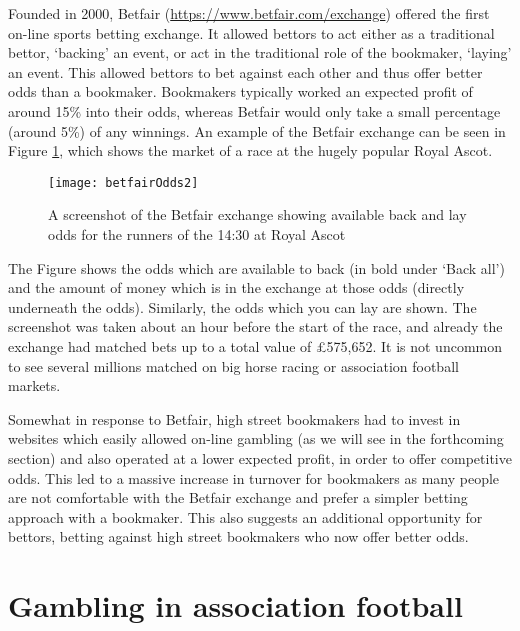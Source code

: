 Founded in 2000, Betfair (\url{https://www.betfair.com/exchange}) offered the first on-line sports betting exchange. It
allowed bettors to act either as a traditional bettor, `backing' an event, or act in the traditional role of the
bookmaker, `laying' an event. This allowed bettors to bet against each other and thus offer better odds than a
bookmaker. Bookmakers typically worked an expected profit of around 15\% into their odds, whereas Betfair would only
take a small percentage (around 5\%) of any winnings. An example of the Betfair exchange can be seen in Figure
\ref{fig:betfairOdds}, which shows the market of a race at the hugely popular Royal Ascot.
\begin{figure}[htp]
\begin{center}
  \texttt{[image: betfairOdds2]}
  \caption{\label{fig:betfairOdds} A screenshot of the Betfair exchange showing available back and lay odds for the
  runners of the 14:30 at Royal Ascot}
\end{center}
\end{figure}
The Figure shows the odds which are available to back (in bold under `Back all') and the amount of money which is in the
exchange at those odds (directly underneath the odds). Similarly, the odds which you can lay are shown. The screenshot
was taken about an hour before the start of the race, and already the exchange had matched bets up to a total value of
\pounds575,652. It is not uncommon to see several millions matched on big horse racing or association football markets.

Somewhat in response to Betfair, high street bookmakers had to invest in websites which easily allowed on-line gambling
(as we will see in the forthcoming section) and also operated at a lower expected profit, in order to offer competitive
odds. This led to a massive increase in turnover for bookmakers as many people are not comfortable with the Betfair
exchange and prefer a simpler betting approach with a bookmaker. This also suggests an additional opportunity for
bettors, betting against high street bookmakers who now offer better odds.

\section{Gambling in association football}
\label{sec:Gambling_in_association_football}

